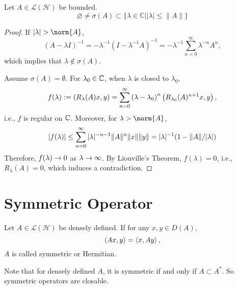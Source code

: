 \documentclass[a4paper,12pt]{article}
\begin{document}
\begin{prop}
    Let $A \in \mathcal{L}(\mathcal{H})$ be bounded.
    \begin{equation*}
        \varnothing \neq \sigma(A) \subset\{\lambda \in \mathbb{C}| | \lambda \mid \leq\|A\|\}
    \end{equation*}
\end{prop}
\begin{proof}
    If $\abs{\lambda} > \norm{A}$,
    \begin{equation*}
        (A-\lambda I)^{-1}=-\lambda^{-1}\left(I-\lambda^{-1} A\right)^{-1}=-\lambda^{-1} \sum_{n=0}^{\infty} \lambda^{-n} A^n,
    \end{equation*}
    which implies that $\lambda \notin \sigma(A)$.

    Assume $\sigma(A) = \emptyset$. For $\lambda_0 \in \mathbb{C}$, when $\lambda$ is closed to $\lambda_0$,
    \begin{equation*}
        f(\lambda) \vcentcolon= \left(R_\lambda(A) x, y\right)=\sum_{n=0}^{\infty}\left(\lambda-\lambda_0\right)^n\left(R_{\lambda_0}(A)^{n+1} x, y\right),
    \end{equation*}
    i.e., $f$ is regular on $\mathbb{C}$. Moreover, for $\lambda > \norm{A}$,
    \begin{equation*}
        \left\lvert f(\lambda)\right\lvert \leq \sum_{n=0}^{\infty}|\lambda|^{-n-1}\|A\|^n\|x\|\|y\|=|\lambda|^{-1}(1-\|A\| /|\lambda|)
    \end{equation*}
    Therefore, $f(\lambda) \rightarrow 0$ as $\lambda \rightarrow \infty$. By Liouville's Theorem, $f(\lambda) = 0$, i.e., $R_\lambda(A) = 0$, which induces a contradiction.
\end{proof}

\section{Symmetric Operator}

\begin{defn}
    Let $A \in \mathcal{L}(\mathcal{H})$ be densely defined. If for any $x,y \in D(A)$,
    \begin{equation*}
        \left\langle Ax,y \right\rangle = \left\langle x,Ay \right\rangle,
    \end{equation*}
    $A$ is called symmetric or Hermitian.
\end{defn}
\begin{rmk}
    Note that for densely defined $A$, it is symmetric if and only if $A \subset A^*$. So symmetric operators are closable.
\end{rmk}
\end{document}
